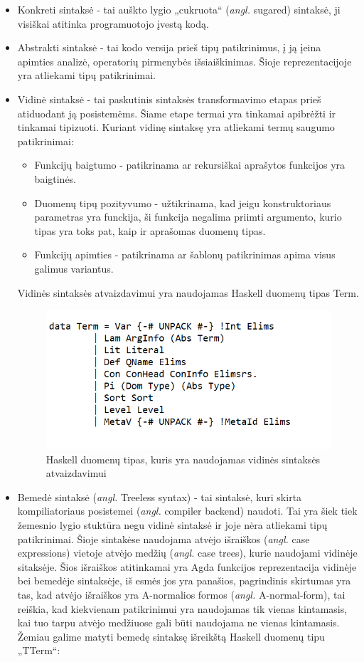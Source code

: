 \documentclass{VUMIFPSkursinis}
\begin{document}
\begin{itemize}
	\item Konkreti sintaksė - tai auškto lygio „cukruota“ (\textit{angl.} sugared) sintaksė, ji visiškai atitinka programuotojo įvestą kodą.
	\item Abstrakti sintaksė - tai kodo versija prieš tipų patikrinimus, į ją įeina apimties analizė, operatorių pirmenybės išsiaiškinimas. Šioje reprezentacijoje yra atliekami tipų patikrinimai.
	\item Vidinė sintaksė - tai paskutinis sintaksės transformavimo etapas prieš atiduodant ją posistemėms. Šiame etape termai yra tinkamai apibrėžti ir tinkamai tipizuoti. Kuriant vidinę sintaksę yra atliekami termų saugumo patikrinimai:
	\begin{itemize}
		\item Funkcijų baigtumo - patikrinama ar rekursiškai aprašytos funkcijos yra baigtinės.
		\item Duomenų tipų pozityvumo - užtikrinama, kad jeigu konstruktoriaus parametras yra funckija, ši funkcija negalima priimti argumento, kurio tipas yra toks pat, kaip ir aprašomas duomenų tipas.
		\item Funkcijų apimties - patikrinama ar šablonų patikrinimas apima visus galimus variantus.
	\end{itemize}
	Vidinės sintaksės atvaizdavimui yra naudojamas Haskell duomenų tipas Term.
	\begin{figure}[H]
		\centering
		\includegraphics{HaskellTerm.png}
		\caption{Haskell duomenų tipas, kuris yra naudojamas vidinės sintaksės atvaizdavimui}
		\centering
		\end{figure}
		\item Bemedė sintaksė (\textit{angl.} Treeless syntax) - tai sintaksė, kuri skirta kompiliatoriaus posistemei (\textit{angl.} compiler backend) naudoti. Tai yra šiek tiek žemesnio lygio stuktūra negu vidinė sintaksė ir joje nėra atliekami tipų patikrinimai. Šioje sintakėse naudojama atvėjo išraiškos (\textit{angl.} case expressions) vietoje atvėjo medžių (\textit{angl.} case trees), kurie naudojami vidinėje sitaksėje. Šios išraiškos atitinkamai yra Agda funkcijos reprezentacija vidinėje bei bemedėje sintaksėje, iš esmės jos yra panašios, pagrindinis skirtumas yra tas, kad atvėjo išraiškos yra A-normalios formos (\textit{angl.} A-normal-form), tai reiškia, kad kiekvienam patikrinimui yra naudojamas tik vienas kintamasis, kai tuo tarpu atvėjo medžiuose gali būti naudojama ne vienas kintamasis. Žemiau galime matyti bemedę sintaksę išreikštą Haskell duomenų tipu „TTerm“:

\end{itemize}
\end{document}
